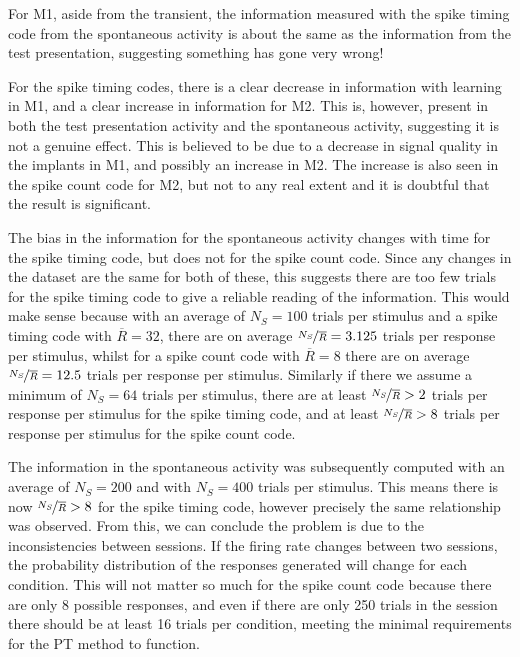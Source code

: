For \ac{M1}, aside from the transient, the information measured with the spike timing code from the spontaneous activity is about the same as the information from the test presentation, suggesting something has gone very wrong!

For the spike timing codes, there is a clear decrease in information with learning in \ac{M1}, and a clear increase in information for \ac{M2}. This is, however, present in both the test presentation activity and the spontaneous activity, suggesting it is not a genuine effect. This is believed to be due to a decrease in signal quality in the implants in \ac{M1}, and possibly an increase in \ac{M2}.
The increase is also seen in the spike count code for \ac{M2}, but not to any real extent and it is doubtful that the result is significant.

The bias in the information for the spontaneous activity changes with time for the spike timing code, but does not for the spike count code.
Since any changes in the dataset are the same for both of these, this suggests there are too few trials for the spike timing code to give a reliable reading of the information. This would make sense because with an average of $N_S = 100$ trials per stimulus and a spike timing code with $\overline{R} = 32$, there are
on average $\nicefrac{N_S}{\overline{R}} = 3.125$ trials per response per stimulus,
whilst for a spike count code with $\overline{R} = 8$ there are on average $\nicefrac{N_S}{\overline{R}} = 12.5$ trials per response per stimulus.
Similarly if there we assume a minimum of $N_S = 64$ trials per stimulus, there are
at least $\nicefrac{N_S}{\overline{R}} > 2$ trials per response per stimulus for the spike timing code, and
at least $\nicefrac{N_S}{\overline{R}} > 8$ trials per response per stimulus for the spike count code.

The information in the spontaneous activity was subsequently computed with an average of $N_S = 200$ and with $N_S = 400$ trials per stimulus.
This means there is now $\nicefrac{N_S}{\overline{R}} > 8$ for the spike timing code, however precisely the same relationship was observed.
From this, we can conclude the problem is due to the inconsistencies between sessions. If the firing rate changes between two sessions, the probability distribution of the responses generated will change for each condition. This will not matter so much for the spike count code because there are only 8 possible responses, and even if there are only 250 trials in the session there should be at least 16 trials per condition, meeting the minimal requirements for the \ac{PT} method to function.

